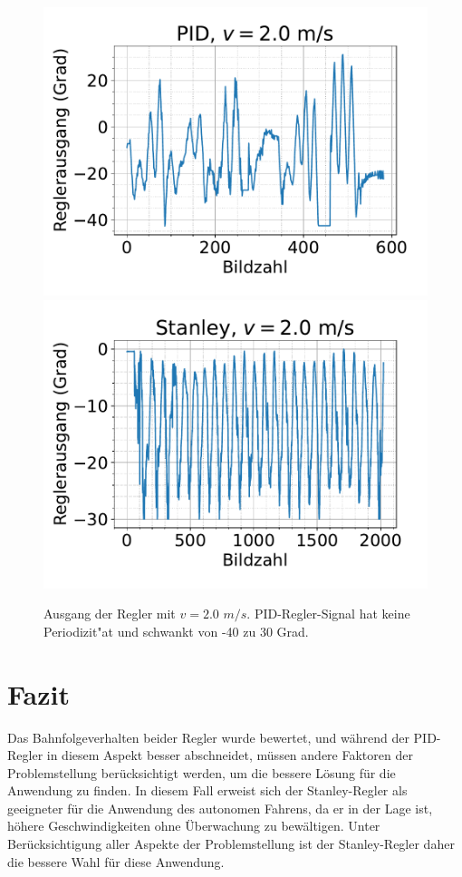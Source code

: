 \documentclass[arbeit=studie,oneside,BCOR=12mm]{ArbeitRST}
\begin{document}
\begin{figure}[h]
    \centering
    \includegraphics[scale=0.47]{pid2.0}
    \includegraphics[scale=0.47]{Stan2.0}
    \caption{Ausgang der Regler mit $v = 2.0$ $m/s$. PID-Regler-Signal hat keine Periodizit"at
    und schwankt von -40 zu 30 Grad. }
    \label{reg:2.0}
\end{figure}




\chapter{Fazit}

Das Bahnfolgeverhalten beider Regler wurde bewertet, und während der PID-Regler
in diesem Aspekt besser abschneidet, müssen andere Faktoren der Problemstellung
berücksichtigt werden, um die bessere Lösung für die Anwendung zu finden. In
diesem Fall erweist sich der Stanley-Regler als geeigneter für die Anwendung
des autonomen Fahrens, da er in der Lage ist, höhere Geschwindigkeiten ohne
Überwachung zu bewältigen. Unter Berücksichtigung aller Aspekte der
Problemstellung ist der Stanley-Regler daher die bessere Wahl für diese
Anwendung.
\end{document}
